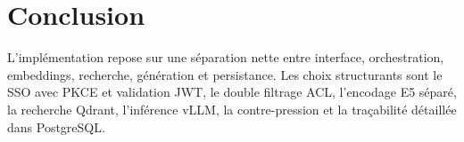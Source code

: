 \section{Conclusion}
L'implémentation repose sur une séparation nette entre interface, orchestration, embeddings, recherche, génération et persistance. Les choix structurants sont le SSO avec PKCE et validation JWT, le double filtrage ACL, l'encodage E5 séparé, la recherche Qdrant, l'inférence vLLM, la contre-pression et la traçabilité détaillée dans PostgreSQL.